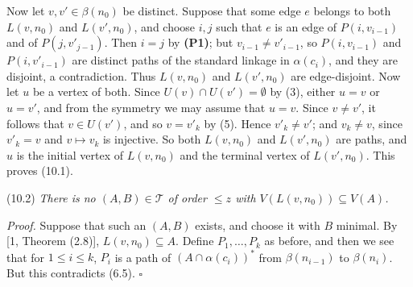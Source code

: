 {Now let $v, v' \in \beta(n_0)$ be distinct. Suppose that some edge $e$ belongs to both $L(v, n_0)$ and $L(v', n_0)$, and choose $i, j$ such that $e$ is an edge of $P(i, v_{i-1})$ and of $P(j, v'_{j-1})$. Then $i = j$ by \textbf{(P1)}; but $v_{i-1} \ne v'_{i-1}$, so $P(i, v_{i-1})$ and $P(i, v'_{i-1})$ are distinct paths of the standard linkage in $\alpha(c_i)$, and they are disjoint, a contradiction. Thus $L(v, n_0)$ and $L(v', n_0)$ are edge-disjoint. Now let $u$ be a vertex of both. Since $U(v) \cap U(v') = \emptyset$ by (3), either $u = v$ or $u = v'$, and from the symmetry we may assume that $u = v$. Since $v \ne v'$, it follows that $v \in U(v')$, and so $v = v'_k$ by (5). Hence $v'_k \ne v'$; and $v_k \ne v$, since $v'_k = v$ and $v \mapsto v_k$ is injective. So both $L(v, n_0)$ and $L(v', n_0)$ are paths, and $u$ is the initial vertex of $L(v, n_0)$ and the terminal vertex of $L(v', n_0)$. This proves (10.1).}

\stmt
(10.2) \textit{There is no $(A, B) \in \mathcal{T}$ of order $\le z$ with $V(L(v, n_0)) \subseteq V(A)$.}

\textit{Proof.} Suppose that such an $(A, B)$ exists, and choose it with $B$ minimal. By [1, Theorem (2.8)], $L(v, n_0) \subseteq A$. Define $P_1, \dots, P_k$ as before, and then we see that for $1 \le i \le k$, $P_i$ is a path of $(A \cap \alpha(c_i))^*$ from $\beta(n_{i-1})$ to $\beta(n_i)$. But this contradicts (6.5). $\square$
